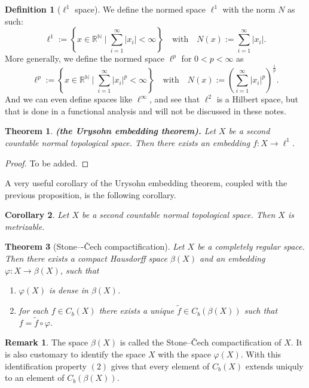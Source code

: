\documentclass[11pt,a4paper]{article}
\theoremstyle{definition}
\newtheorem{definition}{Definition}[section]
\newtheorem{remark}{Remark}[section]
\theoremstyle{plain}
\newtheorem{theorem}{Theorem}[section]
\newtheorem{corollary}[theorem]{Corollary}
\newcommand{\N}{\mathbb{N}}
\newcommand{\R}{\mathbb{R}}
\newcommand{\set}[2]{ \left\{ #1 \mid #2 \right\} }
\newcommand{\abs}[1]{\left\lvert #1\right\rvert}
\renewcommand{\tt}[1]{\textnormal{\textbf{(#1).}}} %
\begin{document}
  \begin{definition}[$\ell^1$ space]
    We define the normed space $\ell^1$ with the norm $N$ as such:
    \[
      \ell^1 := \set{x \in \R^{\N}}{\sum_{i=1}^{\infty} \abs{x_i} < \infty}
      \quad \text{with} \quad
      N(x) := \sum_{i=1}^{\infty} \abs{x_i}.
    \]
    More generally, we define the normed space $\ell^p$ for $0 < p < \infty$ as
    \[
      \ell^p := \set{x \in \R^{\N}}{\sum_{i=1}^{\infty} \abs{x_i}^p < \infty}
      \quad \text{with} \quad
      N(x) := \left(\sum_{i=1}^{\infty} \abs{x_i}^p\right)^{\frac{1}{p}}.
    \]
    And we can even define spaces like $\ell^{\infty}$, and see that
    $\ell^2$ is a Hilbert space, but that is done in a functional analysis
    and will not be discussed in these notes.
  \end{definition}

  \begin{theorem}\tt{the Urysohn embedding theorem}
    Let $X$ be a second countable normal topological space.
    Then there exists an embedding $f \colon X \to \ell^1$.
  \end{theorem}
  \begin{proof}
    To be added.
  \end{proof}

  A very useful corollary of the Urysohn embedding theorem, coupled with
  the previous proposition, is the following corollary.

  \begin{corollary}
    Let $X$ be a second countable normal topological space.
    Then $X$ is metrizable.
  \end{corollary}

  \begin{theorem}[Stone–-\v{C}ech compactification]
    Let $X$ be a completely regular space.
    Then there exists a compact Hausdorff space $\beta(X)$ and an embedding
    $\varphi \colon X \to \beta(X)$, such that
    \begin{enumerate}
      \item[(1)] $\varphi(X)$ is dense in $\beta(X)$.
      \item[(2)] for each $f \in C_b(X)$ there exists a unique 
        $\tilde f \in C_b(\beta(X))$ such that $f = \tilde f \circ \varphi$.
    \end{enumerate}
  \end{theorem}

  \begin{remark}
    The space $\beta(X)$ is called the Stone--\v{C}ech compactification of
    $X$. It is also customary to identify the space $X$ with the space
    $\varphi(X)$. With this identification property $(2)$ gives that
    every element of $C_b(X)$ extends uniquly to an element of $C_b(\beta(X))$.
  \end{remark}
\end{document}
